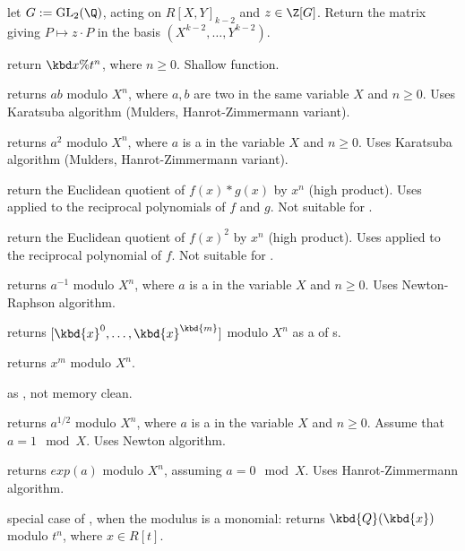  let $G:=\text{GL}_2(\Q)$, acting
on $R[X,Y]_{k-2}$ and $z\in \Z[G]$. Return the matrix giving
$P\mapsto z\cdot P$ in the basis $(X^{k-2},\dots,Y^{k-2})$.


 return $\kbd{x \% } t^n$,
where $n\geq 0$. Shallow function.

 returns $a b$ modulo $X^n$,
where $a,b$ are two  in the same variable $X$ and $n \geq 0$. Uses
Karatsuba algorithm (Mulders, Hanrot-Zimmermann variant).

 returns $a^2$ modulo $X^n$,
where $a$ is a  in the variable $X$ and $n \geq 0$. Uses
Karatsuba algorithm (Mulders, Hanrot-Zimmermann variant).

 return the Euclidean quotient
of $f(x)*g(x)$ by $x^n$ (high product). Uses  applied to
the reciprocal polynomials of $f$ and $g$. Not suitable for .

 return the Euclidean quotient
of $f(x)^2$ by $x^n$ (high product). Uses  applied to
the reciprocal polynomial of $f$. Not suitable for .

 returns $a^{-1}$ modulo $X^n$,
where $a$ is a  in the variable $X$ and $n \geq 0$. Uses
Newton-Raphson algorithm.

 returns $[\kbd{x}^0,
\dots, \kbd{x}^\kbd{m}]$ modulo $X^n$ as a  of s.

 returns $x^m$ modulo
$X^n$.

 as ,
not memory clean.

 returns $a^{1/2}$ modulo $X^n$,
where $a$ is a  in the variable $X$ and $n \geq 0$.
Assume that $a = 1 \mod{X}$. Uses Newton algorithm.

 returns $exp(a)$ modulo $X^n$, assuming
$a = 0 \mod{X}$. Uses Hanrot-Zimmermann algorithm.

 special case of
, when the modulus is a monomial:
returns $\kbd{Q}(\kbd{x})$ modulo $t^n$, where $x \in R[t]$.

